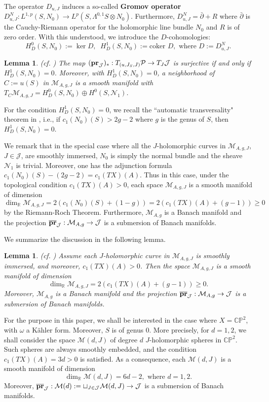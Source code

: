 \documentclass[11pt]{amsart}
\theoremstyle{plain}
\numberwithin{theorem}{section}
\newtheorem{lemma}[theorem]{Lemma}
\theoremstyle{definition}
\newcommand{\C}{{\mathbb C}}
\newcommand{\R}{{\mathbb R}}
\renewcommand{\P}{{\mathbb P}}
\newcommand{\J}{{\mathcal J}}
\newcommand{\M}{{\mathcal M}}
\newcommand{\N}{{\mathcal N}}
\newcommand{\p}{{\mathcal P}}
\begin{document}
The operator $D_{u,J}$ induces a so-called {\bf Gromov operator} $D_{u,J}^N:
L^{1,p}(S,N_0)\rightarrow L^p(S,\Lambda^{0,1} S\otimes N_0)$. Furthermore, 
$D_{u,J}^N=\bar{\partial}+R$ where $\bar{\partial}$ is the Cauchy-Riemann operator for the holomorphic line bundle $N_0$ and $R$ is of zero order. With this understood, we introduce the
$D$-cohomologies:
$$
H^0_D(S,N_0):=\ker D, \;\; H^1_D(S,N_0):=\text{coker } D, \mbox{ where } D:=D_{u,J}^N.
$$

\begin{lemma}
(cf. \cite{IvaS}) The map $({\bf pr}_\J)_\ast: T_{(u,J_S,J)}\p \rightarrow T_J \J$ is surjective if and only if $H^1_D(S,N_0)=0$. Moreover, with $H^1_D(S,N_0)=0$, a neighborhood of $C:=u(S)$ in
$\M_{A,g,J}$ is a smooth manifold with $T_C \M_{A,g,J}= H^0_D(S,N_0)\oplus H^0(S,\N_1)$.
\end{lemma}

For the condition $H^1_D(S,N_0)=0$, we recall the ``automatic transversality" theorem in \cite{HLS},
i.e., if $c_1(N_0)(S)>2g-2$ where $g$ is the genus of $S$, then $H^1_D(S,N_0)=0$. 

We remark that in the special case where all the $J$-holomorphic curves in $\M_{A,g,J}$, $J\in\J$,
are smoothly immersed, $N_0$ is simply the normal bundle and the sheave $\N_1$ is trivial. Moreover, one has the adjunction formula $c_1(N_0)(S)-(2g-2)=c_1(TX)(A)$. Thus in this case, under the topological condition 
$c_1(TX)(A)>0$, each space $\M_{A,g,J}$ is a smooth manifold of dimension
$$
\dim_\R \M_{A,g,J}=2(c_1(N_0)(S)+(1-g))=2(c_1(TX)(A)+(g-1))\geq 0
$$
by the Riemann-Roch Theorem. Furthermore, $\M_{A,g}$ is a Banach manifold and the projection 
$\overline{{\bf pr}}_\J:\M_{A,g}\rightarrow \J$ is a submersion of Banach manifolds. 

We summarize the discussion in the following lemma.

\begin{lemma}
(cf. \cite{HLS}) Assume each $J$-holomorphic curve in $\M_{A,g,J}$ is smoothly immersed, and moreover,
$c_1(TX)(A)>0$. Then the space $\M_{A,g,J}$ is a smooth manifold of dimension
$$
\dim_\R \M_{A,g,J}=2(c_1(TX)(A)+(g-1))\geq 0.
$$
Moreover, $\M_{A,g}$ is a Banach manifold and the projection $\overline{{\bf pr}}_\J:\M_{A,g}\rightarrow \J$ is a submersion of Banach manifolds. 
\end{lemma}


For the purpose in this paper, we shall be interested in the case where $X=\C\P^2$, with $\omega$ a K\"{a}hler form. Moreover, $S$ is of genus $0$. More precisely, for $d=1,2$, we shall consider
the space $\M(d,J)$ of degree $d$ $J$-holomorphic spheres in $\C\P^2$. Such spheres are always smoothly embedded, and the condition $c_1(TX)(A)=3d>0$ is satisfied. As a consequence, each 
$\M(d,J)$ is a smooth manifold of dimension 
$$
\dim_\R\M(d,J)=6d-2, \mbox{ where } d=1,2.
$$
Moreover, $\overline{{\bf pr}}_\J:\M(d):=\sqcup_{J\in\J} \M(d,J)\rightarrow \J$ is a submersion of Banach manifolds. 
\end{document}
